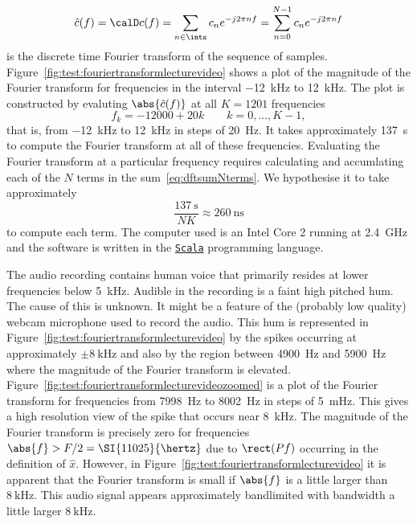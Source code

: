 \begin{test}
\begin{equation}
\hat{c}(f) = \calD c(f) = \sum_{n \in \ints} c_n e^{-j 2\pi n f}  = \sum_{n = 0}^{N-1} c_n e^{-j 2\pi n f}
\end{equation}
is the discrete time Fourier transform of the sequence of samples.  Figure~\ref{fig:test:fouriertransformlecturevideo} shows a plot of the magnitude of the Fourier transform for frequencies in the interval \SI{-12}{\kilo\hertz} to \SI{12}{\kilo\hertz}.  The plot is constructed by evaluting $\abs{\hat{c}(f)}$ at all $K = 1201$ frequencies
\[
f_k = -12000 + 20k \qquad k = 0, \dots, K-1,
\]
that is, from \SI{-12}{\kilo\hertz} to \SI{12}{\kilo\hertz} in steps of \SI{20}{\hertz}.  It takes approximately \SI{137}{\second} to compute the Fourier transform at all of these frequencies.  Evaluating the Fourier transform at a particular frequency requires calculating and accumlating each of the $N$ terms in the sum~\eqref{eq:dftsumNterms}.  We hypothesise it to take approximately
\[
\frac{\SI{137}{\second}}{NK} \approx \SI{260}{\nano\second}
\]
to compute each term.   The computer used is an Intel Core 2 running at \SI{2.4}{\giga\hertz} and the software is written in the \href{http://scala-lang.org/}{\texttt{Scala}} programming language.

The audio recording contains human voice that primarily resides at lower frequencies below \SI{5}{\kilo\hertz}.  Audible in the recording is a faint high pitched hum.  The cause of this is unknown.  It might be a feature of the (probably low quality) webcam microphone used to record the audio.  This hum is represented in Figure~\ref{fig:test:fouriertransformlecturevideo} by the spikes occurring at approximately $\pm\SI{8}{\kilo\hertz}$ and also by the region between \SI{4900}{\hertz} and \SI{5900}{\hertz} where the magnitude of the Fourier transform is elevated.  Figure~\ref{fig:test:fouriertransformlecturevideozoomed} is a plot of the Fourier transform for frequencies from \SI{7998}{\hertz} to \SI{8002}{\hertz} in steps of \SI{5}{\milli\hertz}.  This gives a high resolution view of the spike that occurs near \SI{8}{\kilo\hertz}.  The magnitude of the Fourier transform is precisely zero for frequencies $\abs{f} > F/2 = \SI{11025}{\hertz}$ due to $\rect(Pf)$ occurring in the definition of $\hat{x}$.  However, in Figure~\ref{fig:test:fouriertransformlecturevideo} it is apparent that the Fourier transform is small if $\abs{f}$ is a little larger than $\SI{8}{\kilo\hertz}$.  This audio signal appears approximately bandlimited with bandwidth a little larger $\SI{8}{\kilo\hertz}$.


\end{test}
